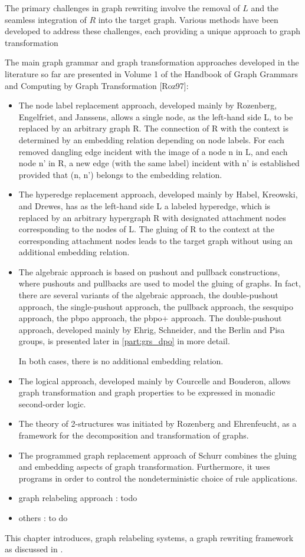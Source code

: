 The primary challenges in graph rewriting involve the removal of \(L\) and the seamless integration of \(R\) into the target graph. Various methods have been developed to address these challenges, each providing a unique approach to graph transformation \cite{handbook_grs_vol1, pb, spo,over,corradini1997algebraic,corradini2006sesqui,ehrig2004adhesive}

The main graph grammar and graph transformation approaches developed in the literature so far are presented in Volume 1 of the Handbook of Graph Grammars and Computing by Graph Transformation [Roz97]: 
\begin{itemize}
    \item  The node label replacement approach, developed mainly by Rozenberg, Engelfriet, and Janssens, allows a single node, as the left-hand side L, to be replaced by an arbitrary graph R. The connection of R with the context is determined by an embedding relation depending on node labels. For each removed dangling edge incident with the image of a node n in L, and each node n' in R, a new edge (with the same label) incident with n' is established provided that (n, n') belongs to the embedding relation. 
    \item The hyperedge replacement approach, developed mainly by Habel, Kreowski, and Drewes, has as the left-hand side L a labeled hyperedge, which is replaced by an arbitrary hypergraph R with designated attachment nodes corresponding to the nodes of L. The gluing of R to the context at the corresponding attachment nodes leads to the target graph without using an additional embedding relation. 
    \item The algebraic approach is based on pushout and pullback constructions, where pushouts and pullbacks are used to model the gluing of graphs. In fact, there are several variants of the algebraic approach, the double-pushout approach, the single-pushout approach, the pullback approach, the sesquipo approach, the pbpo approach, the pbpo+ approach. The double-pushout approach, developed mainly by Ehrig, Schneider, and the Berlin and Pisa groups, is presented later in \autoref*{part:grs_dpo} in more detail.
    
    In both cases, there is no additional embedding relation. 
    \item The logical approach, developed mainly by Courcelle and Bouderon, allows graph transformation and graph properties to be expressed in monadic second-order logic. 
    \item The theory of 2-structures was initiated by Rozenberg and Ehrenfeucht, as a framework for the decomposition and transformation of graphs.
    \item The programmed graph replacement approach of Schurr combines the gluing and embedding aspects of graph transformation. Furthermore, it uses programs in order to control the nondeterministic choice of rule applications.
    \item graph relabeling approach : todo
    \item others : to do
\end{itemize}

This chapter introduces, graph relabeling systems, a graph rewriting framework as discussed in \cite{Litovsky1999gls}.
